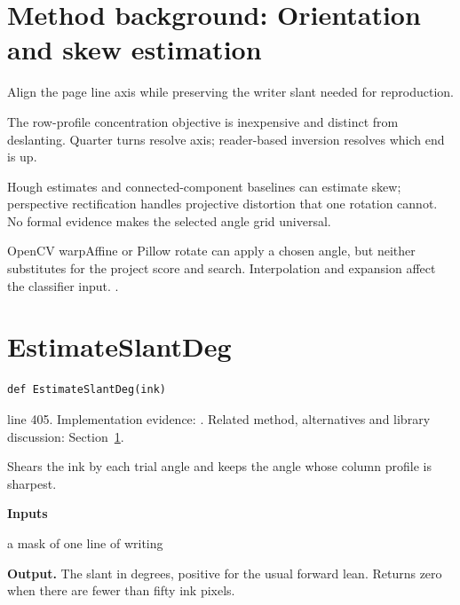 \section{Method background: Orientation and skew estimation}\label{method:deskew}
Align the page line axis while preserving the writer slant needed for reproduction.


The row-profile concentration objective is inexpensive and distinct from deslanting. Quarter turns resolve axis; reader-based inversion resolves which end is up.


Hough estimates and connected-component baselines can estimate skew; perspective rectification handles projective distortion that one rotation cannot. No formal evidence makes the selected angle grid universal.


OpenCV warpAffine or Pillow rotate can apply a chosen angle, but neither substitutes for the project score and search. Interpolation and expansion affect the classifier input. \cite{postl1986,wolberg1990,opencvtransform,pillowops}.


\section{EstimateSlantDeg}\label{fn:segment:EstimateSlantDeg}
\begin{lstlisting}[style=sig]
def EstimateSlantDeg(ink)
\end{lstlisting}
 line 405. Implementation evidence: \cite{code2026}. Related method, alternatives and library discussion: Section~\ref{method:deskew}.


Shears the ink by each trial angle and keeps the angle whose column profile is sharpest.




\noindent\textbf{Inputs}
\begin{description}[leftmargin=2.2em,style=nextline,font=\normalfont\ttfamily]\setlength\itemsep{1pt}
  \item[{ink}] \normalfont a mask of one line of writing
\end{description}

\noindent\textbf{Output.} The slant in degrees, positive for the usual forward lean. Returns zero when there are fewer than fifty ink pixels.


